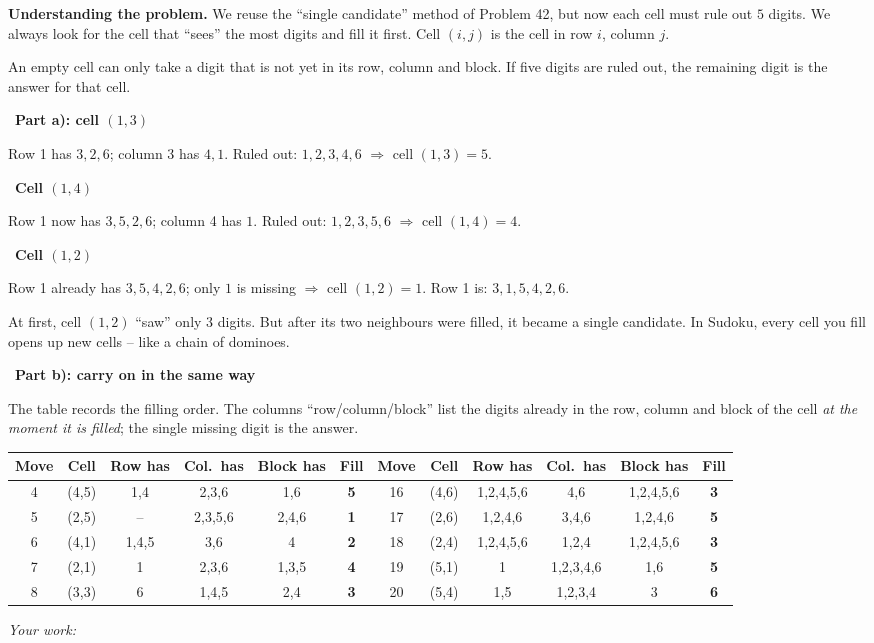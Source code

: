 \documentclass[11pt]{article}
\newif\ifsol \solfalse
\renewcommand{\arraystretch}{1.35}
\newcommand{\StuProb}[2]{\begin{probboxS}{#1}{#2}\StuProbBody\end{probboxS}}
\newcommand{\probsol}[1]{%
  \begin{lrbox}{\solmeasure}\begin{minipage}{\dimexpr\linewidth-24pt\relax}#1\end{minipage}\end{lrbox}%
  \ifsol
    \begin{solbox}#1\end{solbox}%
  \else
    \setlength{\solht}{\dimexpr\ht\solmeasure+\dp\solmeasure+0.85cm\relax}%
    \ifdim\solht<1.35cm\setlength{\solht}{1.35cm}\fi
    \ifdim\solht>\StudentMaxWork\setlength{\solht}{\StudentMaxWork}\fi
    \par\noindent\begin{minipage}{\linewidth}%
    \expandafter\StuProb\StuProbArgs
    \begin{tcolorbox}[colback=white,colframe=Line,boxrule=0.8pt,arc=5pt,
      left=8pt,right=8pt,top=4pt,bottom=4pt,height=\solht]{\footnotesize\color{Slate}\itshape\WorkWord}\end{tcolorbox}%
    \end{minipage}\par\medskip
  \fi}
\newlength{\StudentMaxWork}\setlength{\StudentMaxWork}{4.5cm}
\newcommand{\step}[2]{\par\smallskip\noindent{\bfseries\color{tmBlue!85!black}\StepWord~#1.}\ {\bfseries #2}\par\nopagebreak}
\def\WorkWord{Your work:}
\def\StepWord{Step}
\begin{document}
\probsol{
\textbf{Understanding the problem.} We reuse the ``single candidate'' method of Problem 42, but now each cell must rule out $5$ digits.
We always look for the cell that ``sees'' the most digits and fill it first. Cell $(i, j)$ is the cell in row $i$, column $j$.
\begin{recallbox}An empty cell can only take a digit that is not yet in its row, column and block. If five digits are ruled out, the
remaining digit is the answer for that cell.\end{recallbox}
\step{1}{Part a): cell $(1,3)$}
Row 1 has $3, 2, 6$; column 3 has $4, 1$. Ruled out: $1, 2, 3, 4, 6$ $\Rightarrow$ cell $(1,3) = 5$.
\step{2}{Cell $(1,4)$}
Row 1 now has $3, 5, 2, 6$; column 4 has $1$. Ruled out: $1, 2, 3, 5, 6$ $\Rightarrow$ cell $(1,4) = 4$.
\step{3}{Cell $(1,2)$}
Row 1 already has $3, 5, 4, 2, 6$; only $1$ is missing $\Rightarrow$ cell $(1,2) = 1$. Row 1 is: $3, 1, 5, 4, 2, 6$.
\begin{tipbox}At first, cell $(1,2)$ ``saw'' only $3$ digits. But after its two neighbours were filled, it became a single candidate.
In Sudoku, every cell you fill opens up new cells -- like a chain of dominoes.\end{tipbox}
\step{4}{Part b): carry on in the same way}
The table records the filling order. The columns ``row/column/block'' list the digits already in the row, column and block of the cell
\emph{at the moment it is filled}; the single missing digit is the answer.
\begin{center}\scriptsize
\setlength{\tabcolsep}{3pt}\renewcommand{\arraystretch}{1.12}
\begin{tabular}{|c|c|c|c|c|c||c|c|c|c|c|c|}
\hline
\rowcolor{tmBlue!10} Move & Cell & Row has & Col.\ has & Block has & Fill & Move & Cell & Row has & Col.\ has & Block has & Fill\\ \hline
4 & (4,5) & 1,4 & 2,3,6 & 1,6 & \textbf{5} & 16 & (4,6) & 1,2,4,5,6 & 4,6 & 1,2,4,5,6 & \textbf{3}\\ \hline
5 & (2,5) & -- & 2,3,5,6 & 2,4,6 & \textbf{1} & 17 & (2,6) & 1,2,4,6 & 3,4,6 & 1,2,4,6 & \textbf{5}\\ \hline
6 & (4,1) & 1,4,5 & 3,6 & 4 & \textbf{2} & 18 & (2,4) & 1,2,4,5,6 & 1,2,4 & 1,2,4,5,6 & \textbf{3}\\ \hline
7 & (2,1) & 1 & 2,3,6 & 1,3,5 & \textbf{4} & 19 & (5,1) & 1 & 1,2,3,4,6 & 1,6 & \textbf{5}\\ \hline
8 & (3,3) & 6 & 1,4,5 & 2,4 & \textbf{3} & 20 & (5,4) & 1,5 & 1,2,3,4 & 3 & \textbf{6}\\ \hline

\end{tabular}
\end{center}}
\end{document}
